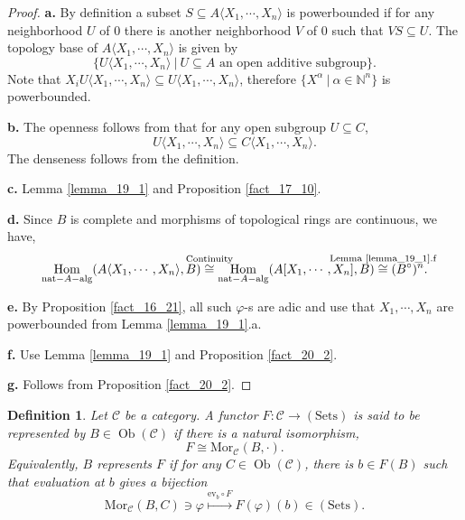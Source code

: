 \documentclass[8pt]{article}
\numberwithin{equation}{section}
\newtheorem{definition}{Definition}[subsection]
\DeclareMathOperator{\Hom}{Hom}
\DeclareMathOperator{\Ob}{Ob}
\newcommand{\N}[0]{\mathbb{N}}
\newcommand{\sep}[0]{\:|\:}
\newcommand{\sC}[0]{\mathscr{C}}
\newcommand{\comppol}[1]{\langle X_1,\cdots, X_{#1}\rangle}
\begin{document}
\begin{proof}
    \textbf{a.} By definition a subset $S\subseteq A\langle X_1,\cdots,X_n\rangle$ is powerbounded if for any neighborhood $U$ of $0$ there is another neighborhood $V$ of $0$ such that $VS\subseteq U$. The topology base of $A\langle X_1,\cdots,X_n\rangle$ is given by
    \begin{equation*}
    \{U\langle X_1,\cdots,X_n\rangle\sep U\subseteq A\text{ an open additive subgroup}\}.
    \end{equation*}
    Note that $X_i U\langle X_1,\cdots,X_n\rangle\subseteq U\langle X_1,\cdots,X_n\rangle$, therefore $\{X^\alpha\sep \alpha\in\N^n\}$ is powerbounded.
    \par\textbf{b.} The openness follows from that for any open subgroup $U\subseteq C$, 
    \begin{equation*}
        U\comppol{n}\subseteq C\comppol{n}.
    \end{equation*}
    The denseness follows from the definition.
    \par\textbf{c.} Lemma \ref{lemma_19_1} and Proposition \ref{fact_17_10}. 
    \par\textbf{d.} Since $B$ is complete and morphisms of topological rings are continuous, we have,
    \begin{equation*}
        \Hom_{\mathrm{nat-}A\mathrm{-alg}}(A\comppol{n},B)\stackrel{\text{\makebox[0pt][c]{Continuity}}}{\cong} \Hom_{\mathrm{nat-}A\mathrm{-alg}}(A[X_1,\cdots,X_n],B)\stackrel{\text{\makebox[0pt][c]{Lemma \ref{lemma_19_1}.f}}}{\cong}(B^\circ)^n.
    \end{equation*}
    \par\textbf{e.} By Proposition \ref{fact_16_21}, all such $\varphi$-s are adic and use that $X_1,\cdots,X_n$ are powerbounded from Lemma \ref{lemma_19_1}.a.
    \par\textbf{f.} Use Lemma \ref{lemma_19_1} and Proposition \ref{fact_20_2}.
    \par\textbf{g.} Follows from Proposition \ref{fact_20_2}.
\end{proof}
\begin{definition}
    Let $\sC$ be a category. A functor $F:\sC\to(\mathrm{Sets})$ is said to be represented by $B\in\Ob(\sC)$ if there is a natural isomorphism,
    \begin{equation*}
        F\cong \mathrm{Mor}_\sC(B,\cdot).
    \end{equation*}
    Equivalently, $B$ represents $F$ if for any $C\in\Ob(\sC)$, there is $b\in F(B)$ such that evaluation at $b$ gives a bijection 
    \begin{equation*}
        \mathrm{Mor}_\sC(B,C)\ni\varphi\stackrel{\mathrm{ev}_b\circ F}{\mapsto}F(\varphi)(b)\in(\mathrm{Sets}).
    \end{equation*} 
\end{definition}
\end{document}
